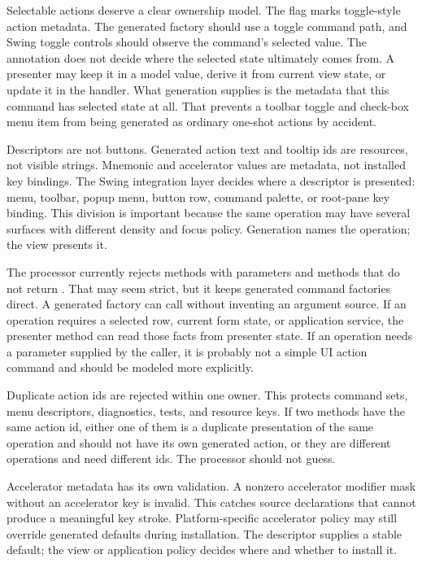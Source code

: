 Selectable actions deserve a clear ownership model. The  flag
marks toggle-style action metadata. The generated factory should use a toggle
command path, and Swing toggle controls should observe the command's selected
value. The annotation does not decide where the selected state ultimately
comes from. A presenter may keep it in a model value, derive it from current
view state, or update it in the handler. What generation supplies is the
metadata that this command has selected state at all. That prevents a toolbar
toggle and check-box menu item from being generated as ordinary one-shot
actions by accident.

Descriptors are not buttons. Generated action text and tooltip ids are
resources, not visible strings. Mnemonic and accelerator values are metadata,
not installed key bindings. The Swing integration layer decides where a
descriptor is presented: menu, toolbar, popup menu, button row, command
palette, or root-pane key binding. This division is important because the same
operation may have several surfaces with different density and focus policy.
Generation names the operation; the view presents it.

The processor currently rejects methods with parameters and methods that do
not return . That may seem strict, but it keeps generated command
factories direct. A generated factory can call  without
inventing an argument source. If an operation requires a selected row, current
form state, or application service, the presenter method can read those facts
from presenter state. If an operation needs a parameter supplied by the caller,
it is probably not a simple UI action command and should be modeled more
explicitly.

Duplicate action ids are rejected within one owner. This protects command
sets, menu descriptors, diagnostics, tests, and resource keys. If two methods
have the same action id, either one of them is a duplicate presentation of the
same operation and should not have its own generated action, or they are
different operations and need different ids. The processor should not guess.

Accelerator metadata has its own validation. A nonzero accelerator modifier
mask without an accelerator key is invalid. This catches source declarations
that cannot produce a meaningful key stroke. Platform-specific accelerator
policy may still override generated defaults during installation. The
descriptor supplies a stable default; the view or application policy decides
where and whether to install it.

